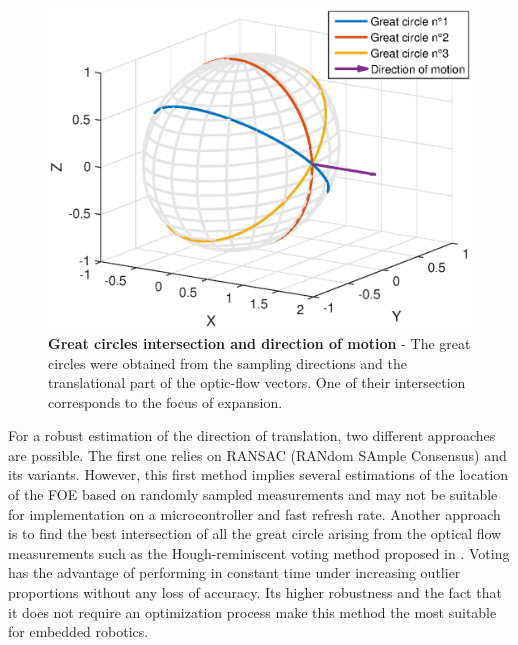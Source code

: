 \begin{figure}
\centering
\includegraphics[width=0.7\linewidth]{images/matlab/voting}
\caption{\textbf{Great circles intersection and direction of motion} - The great circles were obtained from the sampling directions and the translational part of the optic-flow vectors. One of their intersection corresponds to the focus of expansion. \label{fig:voting}}
\end{figure}

For a robust estimation of the direction of translation, two different approaches are possible. The first one relies on RANSAC (RANdom SAmple Consensus) and its variants. However, this first method implies several estimations of the location of the FOE based on randomly sampled measurements and may not be suitable for implementation on a microcontroller and fast refresh rate. Another approach is to find the best intersection of all the great circle arising from the optical flow measurements such as the Hough-reminiscent voting method proposed in \cite{lim}. Voting has the advantage of performing in constant time under increasing outlier proportions without any loss of accuracy. Its higher robustness and the fact that it does not require an optimization process make this method the most suitable for embedded robotics. 
 

